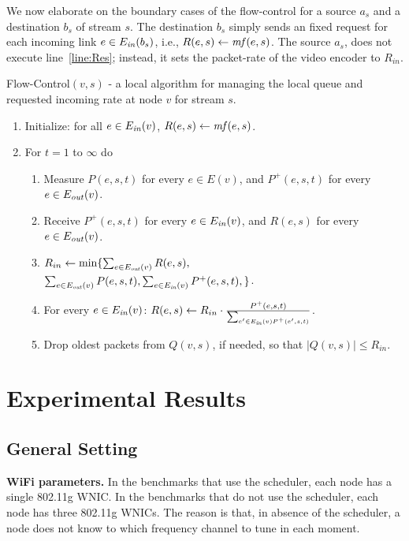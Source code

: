 \documentclass[12pt]{article}
\newenvironment{proof sketch}[1]{\noindent {\emph{Proof sketch of #1:}}}{\hfill \qed}
\newcommand{\mf}{\text{\emph{mf}}}
\newcommand{\Ein}{E_{\text{\emph{in}}}}
\newcommand{\Eout}{E_{\text{\emph{out}}}}
\begin{document}
We now elaborate on the boundary cases of the flow-control for a
source $a_s$ and a destination $b_s$ of stream $s$.  The destination
$b_s$ simply sends an fixed request for each incoming link $e\in \Ein(b_s)$, i.e.,
$R(e,s)\gets \mf(e,s)$.  The source $a_s$, does not execute
line~\ref{line:Res}; instead, it sets the packet-rate of the video
encoder to $R_{in}$.


\begin{algorithm}
  \caption{Flow-Control$(v,s)$ - a local algorithm for managing the
    local queue and requested incoming rate at node $v$ for stream
    $s$.}
\label{alg:FC}
  \begin{enumerate}
  \item Initialize: for all $e\in \Ein(v)$, $R(e,s)\gets \mf(e,s)$.
  \item For $t=1$ to $\infty$ do
    \begin{enumerate}
    \item Measure $P(e,s,t)$ for every $e\in E(v)$, and $P^+(e,s,t)$ for every $e\in\Eout(v)$.
    \item Receive $P^+(e,s,t)$ for every $e\in\Ein(v)$, and $R(e,s)$ for every $e\in \Eout(v)$.
    \item \label{line:Rin}
$R_{in} \gets \min\{\sum_{e\in\Eout(v)} R(e,s),$\\
$ \sum_{e\in\Eout(v)} P(e,s,t), \sum_{e\in\Ein(v)} P^+(e,s,t),
            \}$.
          \item \label{line:Res}
For every $e\in\Ein(v)$: $R(e,s) \gets R_{in} \cdot
            \frac{P^+(e,s,t)}{\sum_{e'\in\Ein(v) P^+(e',s,t)}}$.
            \item Drop oldest packets from $Q(v,s)$, if needed, so
              that $|Q(v,s)|\leq R_{in}$.
    \end{enumerate}
  \end{enumerate}
\end{algorithm}

\section{Experimental Results}
\subsection{General Setting}

\noindent
\textbf{WiFi parameters.}  In the benchmarks that use the scheduler,
each node has a single 802.11g WNIC.  In the benchmarks that do not
use the scheduler, each node has three 802.11g WNICs.  The reason is
that, in absence of the scheduler, a node does not know to which
frequency channel to tune in each moment.
\end{document}
